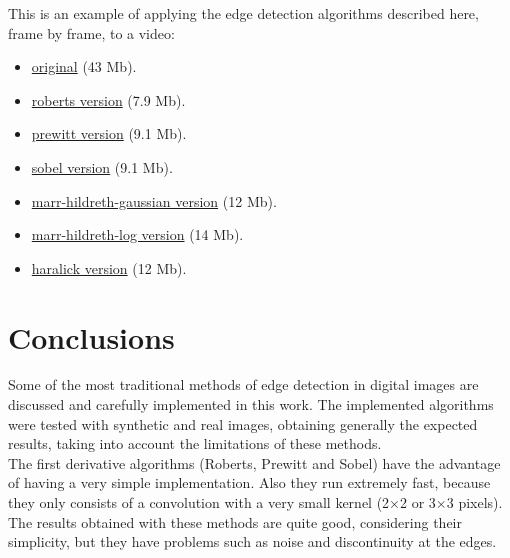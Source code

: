 \documentclass{ipol}
\numberwithin{equation}{section}
\numberwithin{table}{section}
\numberwithin{figure}{section}
\begin{document}
This is an example of applying the edge detection algorithms described here, frame by frame, to a video: 
\begin{itemize}
	\centering
	\item \href{http://iie.fing.edu.uy/~haldos/ipol/video.mov}{original} (43 Mb).
\end{itemize}
\begin{multicols}{2}
\begin{itemize}
	\item \href{http://iie.fing.edu.uy/~haldos/ipol/video-roberts-wide_0.1.mov}{roberts version} (7.9 Mb).
	\item \href{http://iie.fing.edu.uy/~haldos/ipol/video-prewitt-wide_0.1.mov}{prewitt version} (9.1 Mb).
	\item \href{http://iie.fing.edu.uy/~haldos/ipol/video-sobel-wide_0.1.mov}{sobel version} (9.1 Mb).
	\item \href{http://iie.fing.edu.uy/~haldos/ipol/video-marr-hildreth-gaussian-wide_3_19_0.04.mov}{marr-hildreth-gaussian version} (12 Mb).
	\item \href{http://iie.fing.edu.uy/~haldos/ipol/video-marr-hildreth-log-wide_3_25_0.04.mov}{marr-hildreth-log version} (14 Mb).
	\item \href{http://iie.fing.edu.uy/~haldos/ipol/video-haralick-wide_0.5.mov}{haralick version} (12 Mb).
\end{itemize}
\end{multicols}


\section{Conclusions}
\label{sec:conclusions}

Some of the most traditional methods of edge detection in digital images are discussed and carefully implemented in this work. The implemented algorithms were tested with synthetic and real images, obtaining generally the expected results, taking into account the limitations of these methods. \\

The first derivative algorithms (Roberts, Prewitt and Sobel) have the advantage of having a very simple implementation. Also they run extremely fast, because they only consists of a convolution with a very small kernel (2$\times$2 or 3$\times$3 pixels). The results obtained with these methods are quite good, considering their simplicity, but they have problems such as noise and discontinuity at the edges. \\
\end{document}

